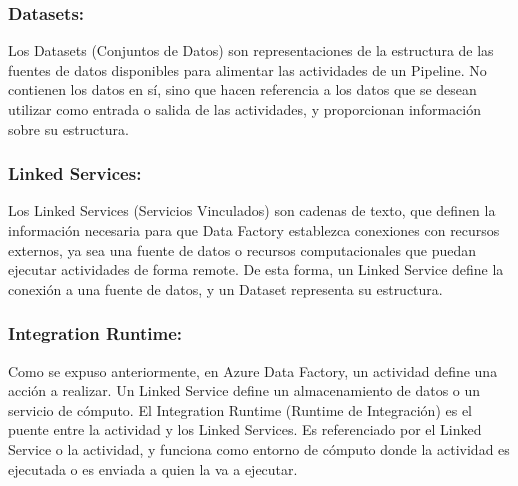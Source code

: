 \subsubsection{Datasets:}

Los Datasets (Conjuntos de Datos) son representaciones de la estructura de las fuentes de datos disponibles para 
alimentar las actividades de un Pipeline. No contienen los datos en sí, sino que hacen referencia a los datos que se 
desean utilizar como entrada o salida de las actividades, y proporcionan información sobre su estructura.

\subsubsection{Linked Services:}

Los Linked Services (Servicios Vinculados) son cadenas de texto, que definen la información necesaria 
para que Data Factory establezca conexiones con recursos externos, ya sea una fuente de datos o recursos computacionales 
que puedan ejecutar actividades de forma remote. De esta forma, un Linked Service define la conexión a una fuente de 
datos, y un Dataset representa su estructura.

\subsubsection{Integration Runtime:}

Como se expuso anteriormente, en Azure Data Factory, un actividad define una acci\'on a realizar. Un Linked Service define 
un almacenamiento de datos o un servicio de cómputo. El Integration Runtime (Runtime de Integración) es el 
puente entre la actividad y los Linked Services. 
Es referenciado por el Linked Service o la actividad, y funciona como entorno de cómputo donde la actividad es ejecutada 
o es enviada a quien la va a ejecutar. 